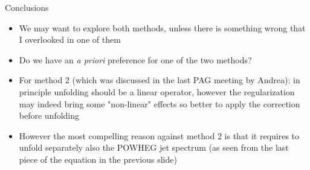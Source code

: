 \documentclass[xcolor={usenames,dvipsnames}]{beamer}
\begin{document}
\begin{frame}{Conclusions}
\begin{itemize}
\item We may want to explore both methods, unless there is something wrong that I overlooked in one of them
\item Do we have an \emph{a priori} preference for one of the two methods?
\item For method 2 (which was discussed in the last PAG meeting by Andrea): in principle unfolding should be a linear operator, 
however the regularization may indeed bring some "non-linear" effects so better to apply the correction before unfolding
\item However the most compelling reason against method 2 is that it requires to unfold separately also the POWHEG jet spectrum
(as seen from the last piece of the equation in the previous slide)
\end{itemize}
\end{frame}
\end{document}
